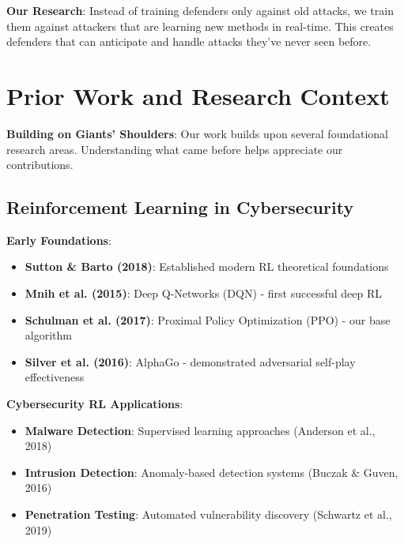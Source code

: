 \documentclass[11pt]{article}
\begin{document}
\begin{example}
\textbf{Our Research}: Instead of training defenders only against old attacks, we train them against attackers that are learning new methods in real-time. This creates defenders that can anticipate and handle attacks they've never seen before.
\end{example}

\section{Prior Work and Research Context}

\begin{foundation}
\textbf{Building on Giants' Shoulders}: Our work builds upon several foundational research areas. Understanding what came before helps appreciate our contributions.
\end{foundation}

\subsection{Reinforcement Learning in Cybersecurity}

\begin{mathdetails}
\textbf{Early Foundations}:
\begin{itemize}
\item \textbf{Sutton \& Barto (2018)}: Established modern RL theoretical foundations
\item \textbf{Mnih et al. (2015)}: Deep Q-Networks (DQN) - first successful deep RL
\item \textbf{Schulman et al. (2017)}: Proximal Policy Optimization (PPO) - our base algorithm
\item \textbf{Silver et al. (2016)}: AlphaGo - demonstrated adversarial self-play effectiveness
\end{itemize}

\textbf{Cybersecurity RL Applications}:
\begin{itemize}
\item \textbf{Malware Detection}: Supervised learning approaches (Anderson et al., 2018)
\item \textbf{Intrusion Detection}: Anomaly-based detection systems (Buczak \& Guven, 2016)
\item \textbf{Penetration Testing}: Automated vulnerability discovery (Schwartz et al., 2019)
\end{itemize}
\end{mathdetails}
\end{document}
